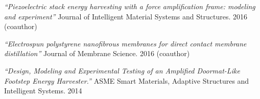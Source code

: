 \documentclass[letterpaper]{deedy-resume} %
\begin{document}
\begin{minipage}[t]{0.66\textwidth}

\begin{tightitemize}
    \item \textit{“Piezoelectric stack energy harvesting with a force amplification frame: modeling and experiment”} Journal of Intelligent Material Systems and Structures. 2016 (coauthor)
    \item \textit{“Electrospun polystyrene nanofibrous membranes for direct contact membrane distillation”} Journal of Membrane Science. 2016 (coauthor)
    \item \textit{“Design, Modeling and Experimental Testing of an Amplified Doormat-Like Footstep Energy Harvester.”} ASME Smart Materials, Adaptive Structures and Intelligent Systems. 2014 
\end{tightitemize}
\sectionspace %







\end{minipage} %

\end{document}
